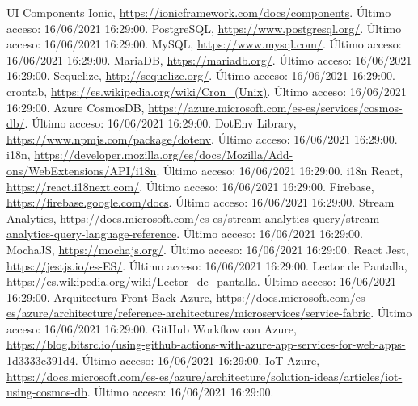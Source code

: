 \begin{thebibliography}{9}
     UI Components Ionic, \url{https://ionicframework.com/docs/components}. Último acceso: 16/06/2021 16:29:00.
     PostgreSQL, \url{https://www.postgresql.org/}. Último acceso: 16/06/2021 16:29:00.
     MySQL, \url{https://www.mysql.com/}. Último acceso: 16/06/2021 16:29:00.
     MariaDB, \url{https://mariadb.org/}. Último acceso: 16/06/2021 16:29:00.
     Sequelize, \url{http://sequelize.org/}. Último acceso: 16/06/2021 16:29:00.
     crontab, \url{https://es.wikipedia.org/wiki/Cron_(Unix)}. Último acceso: 16/06/2021 16:29:00.
     Azure CosmosDB, \url{https://azure.microsoft.com/es-es/services/cosmos-db/}. Último acceso: 16/06/2021 16:29:00.
     DotEnv Library, \url{https://www.npmjs.com/package/dotenv}. Último acceso: 16/06/2021 16:29:00.
     i18n, \url{https://developer.mozilla.org/es/docs/Mozilla/Add-ons/WebExtensions/API/i18n}. Último acceso: 16/06/2021 16:29:00.
     i18n React, \url{https://react.i18next.com/}. Último acceso: 16/06/2021 16:29:00.
     Firebase, \url{https://firebase.google.com/docs}. Último acceso: 16/06/2021 16:29:00.
     Stream Analytics, \url{https://docs.microsoft.com/es-es/stream-analytics-query/stream-analytics-query-language-reference}. Último acceso: 16/06/2021 16:29:00.
     MochaJS, \url{https://mochajs.org/}. Último acceso: 16/06/2021 16:29:00.
     React Jest, \url{https://jestjs.io/es-ES/}. Último acceso: 16/06/2021 16:29:00.
     Lector de Pantalla, \url{https://es.wikipedia.org/wiki/Lector_de_pantalla}. Último acceso: 16/06/2021 16:29:00.
     Arquitectura Front Back Azure, \url{https://docs.microsoft.com/es-es/azure/architecture/reference-architectures/microservices/service-fabric}. Último acceso: 16/06/2021 16:29:00.
     GitHub Workflow con Azure, \url{https://blog.bitsrc.io/using-github-actions-with-azure-app-services-for-web-apps-1d3333c391d4}. Último acceso: 16/06/2021 16:29:00.
     IoT Azure, \url{https://docs.microsoft.com/es-es/azure/architecture/solution-ideas/articles/iot-using-cosmos-db}. Último acceso: 16/06/2021 16:29:00.
\end{thebibliography}